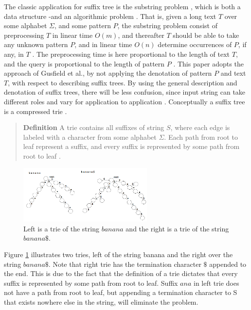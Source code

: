 \documentclass[12pt]{article} %
\begin{document}
The classic application for suffix tree is the substring problem \cite{gusfield, Kunihiko}, which is both a data structure -and an algorithmic problem \cite{mit}. That is, given a long text $T$ over some alphabet $\Sigma$, and some pattern $P$, the substring problem consist of preprocessing $T$ in linear time $O(m)$, and thereafter $T$ should be able to take any unknown pattern $P$, and in linear time $O(n)$ determine occurrences of $ P$, if any, in $T$ \cite{gusfield}. The preprocessing time is here proportional to the length of text $T$, and the query is proportional to the length of pattern $P$ \cite{gusfield}. 
\newline
This paper adopts the approach of Gusfield et al., by not applying the denotation of pattern $P$ and text $T$, with respect to describing suffix trees. By using the general description and denotation of suffix trees, there will be less confusion, since input string can take different roles and vary for application to application \cite{gusfield}.
\newline
\newline
Conceptually a suffix tree is a compressed trie \cite{mit}.  
\begin{quote}
\textbf{Definition}    A trie contains all suffixes of string $S$, where each edge is labeled with a character from some alphabet $\Sigma$. Each path from root to leaf represent a suffix, and every suffix is represented by some path from root to leaf \cite{mit,Kunihiko}.
\end{quote}
\begin{figure}[h]
    \centering
    \includegraphics[width=0.6\textwidth]{trie}
    \captionsetup{width=0.8\textwidth}
    \caption{Left is a trie of the string $banana$ and the right is a trie of the string $banana\$$.}
    \label{fig:trie}
\end{figure}
\newline
Figure \ref{fig:trie} illustrates two tries, left of the string banana and the right over the string $banana\$$. Note that right trie has the termination character $\$$ appended to the end. This is due to the fact that the definition of a trie dictates that every suffix is represented by some path from root to leaf. Suffix $ana$ in left trie does not have a path from root to leaf, but appending a termination character to S that exists nowhere else in the string, will eliminate the problem.
\end{document}
